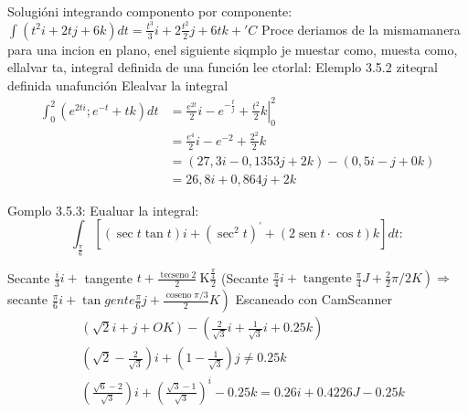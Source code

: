 Solugióni integrando componento por componente: $\int\left(t^2 i+2 t j+6 k\right) d t=\frac{t^3}{3} i+2 \frac{t^2}{2} j+6 t k+' C$
Proce deriamos de la mismamanera para una
incion en plano, enel siguiente siqmplo je
muestar como, muesta como, ellalvar ta, integral definida de una función lee ctorlal:
Elemplo 3.5.2 ziteqral definida unafunción Elealvar la integral
$$
\begin{aligned}
	\int_0^2\left(e^{2 t i} ; e^{-t}+t k\right) d t & =\frac{e^{2 t}}{2} i-e^{-\frac{t}{j}}+\left.\frac{t^2}{2} k\right|_0 ^2 \\
	& =\frac{e^4}{2} i-e^{-2}+\frac{2^2}{2} k \\
	& =(27,3 i-0,1353 j+2 k)-(0,5 i-j+0 k) \\
	& =26,8 i+0,864 j+2 k
\end{aligned}
$$

Gomplo 3.5.3: Eualuar la integral:
$$
\int_{\frac{\pi}{6}}\left[(\sec t \tan t) i+\left(\sec ^2 t\right)^{\prime}+(2 \operatorname{sen} t \cdot \cos t) k\right] d t:
$$

Secante $\frac{i}{3} i+$ tangente $t+\frac{\operatorname{tecseno} 2}{2} \mathrm{~K} \frac{\frac{\pi}{4}}{2}$
(Secante $\left.\frac{\pi}{4} i+\operatorname{tangente} \frac{\pi}{4} J+\frac{2}{2} \pi / 2 K\right) \Rightarrow$
secante $\left.\frac{\pi}{6} i+\tan g e n t e \frac{\pi}{6} j+\frac{\operatorname{coseno} \pi / 3}{2} K\right)$
Escaneado con CamScanner
$$
\begin{aligned}
	& (\sqrt{2} i+j+O K)-\left(\frac{2}{\sqrt{3}} i+\frac{1}{\sqrt{3}} i+0.25 k\right) \\
	& \left(\sqrt{2}-\frac{2}{\sqrt{3}}\right) i+\left(1-\frac{1}{\sqrt{3}}\right) j \neq 0.25 k \\
	& \left(\frac{\sqrt{6}-2}{\sqrt{3}}\right) i+\left(\frac{\sqrt{3}-1}{\sqrt{3}}\right)^i-0.25 k=0.26 i+0.4226 J-0.25 k
\end{aligned}
$$




